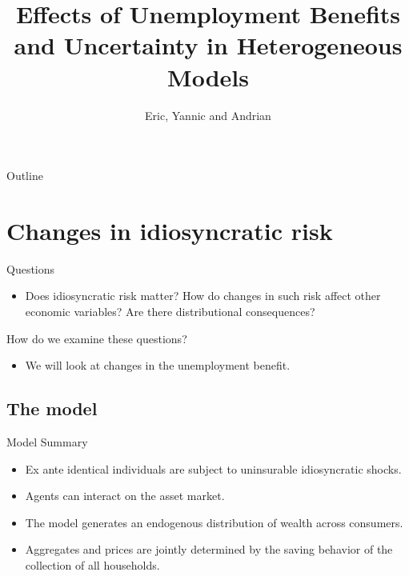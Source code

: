 \documentclass{beamer}
\title{Effects of Unemployment Benefits and Uncertainty in Heterogeneous Models}
\subtitle{}
\author{Eric, Yannic and Andrian}
\begin{document}
\begin{frame}
  \titlepage
\end{frame}

\begin{frame}{Outline}
  \tableofcontents
\end{frame}

\section{Changes in idiosyncratic risk}

\begin{frame}{Questions}
	\begin{itemize}
	
	\item {
	Does idiosyncratic risk matter? How do changes in such risk affect other economic variables? Are there distributional consequences?
	}
	
	\end{itemize}
\end{frame}

\begin{frame}{How do we examine these questions?}
	\begin{itemize}
	
	\item {
	We will look at changes in the unemployment benefit. 
	}
		
	\end{itemize}
\end{frame}

\subsection{The model}
\begin{frame}{Model Summary}
	\begin{itemize}
	
	\item {
	Ex ante identical individuals are subject to uninsurable idiosyncratic shocks. 
	}
	\item {
Agents can interact on the asset market.
	}
	\item {
The model generates an endogenous distribution of wealth across consumers. 
	}	
	\item {
Aggregates and prices are jointly determined by the saving behavior of the collection of all households. 
}

	\end{itemize}

\end{frame}
\end{document}
